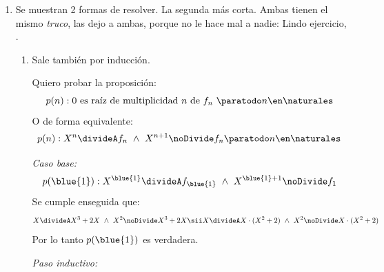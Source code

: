 \begin{enumerate}[label=\roman*)]
        \medskip

        Como $p(1), p(k) \ytext p(k+1)$ resultaron todas verdaderas por principio de inducción en también lo es $p(n) \paratodo n \en \naturales$.

  \item
        Se muestran 2 formas de resolver. La segunda más corta. Ambas tienen el mismo \textit{truco}, las dejo a ambas, porque no le hace mal a nadie:
        Lindo ejercicio, .

        \begin{enumerate}[label=\violet{(\arabic*)}]
          \item

                Sale también por inducción.

                Quiero probar la proposición:
                $$
                  p(n) : \text{0 es raíz de multiplicidad $n$ de $f_n \ \paratodo n \en \naturales$}
                $$
                O de forma equivalente:
                $$
                  p(n) :  X^n \divideA f_n ~ \land ~ X^{n+1} \noDivide f_n \paratodo n \en \naturales
                $$

                \textit{Caso base:}
                $$
                  p(\blue{1}) : X^{\blue{1}} \divideA f_{\blue{1}} ~ \land ~ X^{\blue{1} + 1} \noDivide f_1
                $$
                Se cumple enseguida que:
                $$
                  X \divideA X^3 + 2X ~ \land ~ X^2 \noDivide X^3 + 2X
                  \sii
                  X \divideA X \cdot (X^2 + 2)  ~ \land ~ X^2 \noDivide X \cdot (X^2 + 2)
                $$
                Por lo tanto $p(\blue{1})$ es verdadera.

                \textit{Paso inductivo:}


\end{enumerate}
\end{enumerate}
